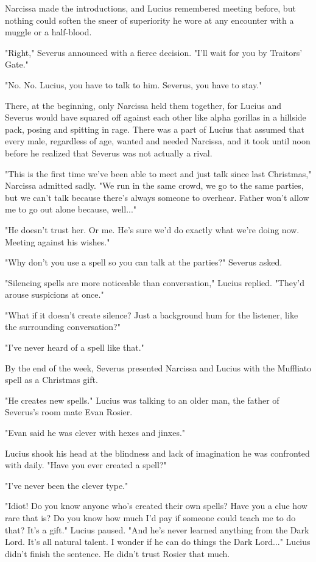 \documentclass[a4paper,11pt]{article}
\begin{document}
Narcissa made the introductions, and Lucius remembered meeting before, but nothing could soften the sneer of superiority he wore at any encounter with a muggle or a half-blood.

"Right," Severus announced with a fierce decision. "I'll wait for you by Traitors' Gate."

"No. No. Lucius, you have to talk to him. Severus, you have to stay."

There, at the beginning, only Narcissa held them together, for Lucius and Severus would have squared off against each other like alpha gorillas in a hillside pack, posing and spitting in rage. There was a part of Lucius that assumed that every male, regardless of age, wanted and needed Narcissa, and it took until noon before he realized that Severus was not actually a rival.

"This is the first time we've been able to meet and just talk since last Christmas," Narcissa admitted sadly. "We run in the same crowd, we go to the same parties, but we can't talk because there's always someone to overhear. Father won't allow me to go out alone because, well..."

"He doesn't trust her. Or me. He's sure we'd do exactly what we're doing now. Meeting against his wishes."

"Why don't you use a spell so you can talk at the parties?" Severus asked.

"Silencing spells are more noticeable than conversation," Lucius replied. "They'd arouse suspicions at once."

"What if it doesn't create silence? Just a background hum for the listener, like the surrounding conversation?"

"I've never heard of a spell like that."

By the end of the week, Severus presented Narcissa and Lucius with the Muffliato spell as a Christmas gift.

"He creates new spells." Lucius was talking to an older man, the father of Severus's room mate Evan Rosier.

"Evan said he was clever with hexes and jinxes."

Lucius shook his head at the blindness and lack of imagination he was confronted with daily. "Have you ever created a spell?"

"I've never been the clever type."

"Idiot! Do you know anyone who's created their own spells? Have you a clue how rare that is? Do you know how much I'd pay if someone could teach me to do that? It's a gift." Lucius paused. "And he's never learned anything from the Dark Lord. It's all natural talent. I wonder if he can do things the Dark Lord..." Lucius didn't finish the sentence. He didn't trust Rosier that much.
\end{document}
